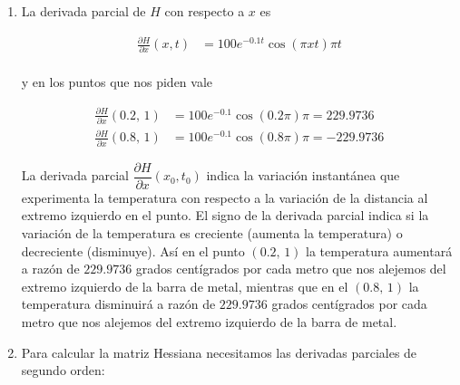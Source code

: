 \documentclass[
  spanish,
  a4paper,
]{scrreport}
\theoremstyle{definition}
\theoremstyle{remark}
\begin{document}
\begin{tcolorbox}[enhanced jigsaw, arc=.35mm, bottomrule=.15mm, bottomtitle=1mm, breakable, colback=white, colbacktitle=quarto-callout-tip-color!10!white, colframe=quarto-callout-tip-color-frame, coltitle=black, left=2mm, leftrule=.75mm, opacityback=0, opacitybacktitle=0.6, rightrule=.15mm, title=\textcolor{quarto-callout-tip-color}{\faLightbulb}\hspace{0.5em}{Solución}, titlerule=0mm, toprule=.15mm, toptitle=1mm]

\begin{enumerate}
\def\labelenumi{\alph{enumi}.}
\item
  La derivada parcial de \(H\) con respecto a \(x\) es

  \begin{align*}
  \frac{\partial H}{\partial x}(x,t) &= 100e^{-0.1t}\cos(\pi xt) \pi t \\
  \end{align*}

  y en los puntos que nos piden vale

  \begin{align*}
  \frac{\partial H}{\partial x}(0.2,\, 1) &= 100e^{-0.1}\cos(0.2\pi) \pi =
  229.9736\\
  \frac{\partial H}{\partial x}(0.8,\, 1) &= 100e^{-0.1}\cos(0.8\pi) \pi =
  -229.9736
  \end{align*}

  La derivada parcial \(\dfrac{\partial H}{\partial x}(x_0,t_0)\) indica
  la variación instantánea que experimenta la temperatura con respecto a
  la variación de la distancia al extremo izquierdo en el punto. El
  signo de la derivada parcial indica si la variación de la temperatura
  es creciente (aumenta la temperatura) o decreciente (disminuye). Así
  en el punto \((0.2,\, 1)\) la temperatura aumentará a razón de
  \(229.9736\) grados centígrados por cada metro que nos alejemos del
  extremo izquierdo de la barra de metal, mientras que en el
  \((0.8,\,1)\) la temperatura disminuirá a razón de \(229.9736\) grados
  centígrados por cada metro que nos alejemos del extremo izquierdo de
  la barra de metal.
\item
  Para calcular la matriz Hessiana necesitamos las derivadas parciales
  de segundo orden:


\end{enumerate}
\end{tcolorbox}
\end{document}
